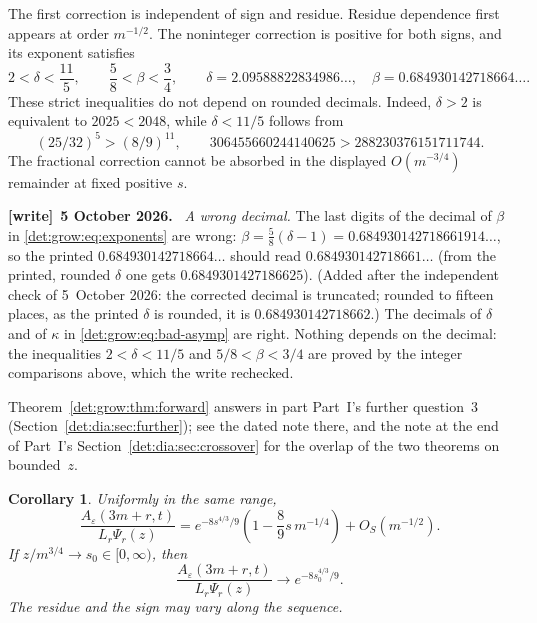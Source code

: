 \documentclass[11pt,letterpaper]{article}
\numberwithin{equation}{section}
\newtheorem{corollary}[theorem]{Corollary}
\theoremstyle{definition}\newtheorem{definition}[theorem]{Definition}
\theoremstyle{remark}\newtheorem{remark}[theorem]{Remark}
\newcommand{\eps}{\varepsilon}
\newenvironment{writenote}[1][]{\par\smallskip\begingroup\small
 \noindent\textbf{[write]}\if\relax\detokenize{#1}\relax\else~\textbf{#1.}\fi\ }%
 {\par\endgroup\smallskip}
\begin{document}
The first correction is independent of sign and residue. Residue
dependence first appears at order $m^{-1/2}$. The noninteger correction
is positive for both signs, and its exponent satisfies
\begin{equation}\label{det:grow:eq:exponents}
 2<\delta<\frac{11}{5},\qquad
 \frac58<\beta<\frac34,
 \qquad
 \delta=2.09588822834986\ldots,\quad
 \beta=0.684930142718664\ldots.
\end{equation}
These strict inequalities do not depend on rounded decimals. Indeed,
$\delta>2$ is equivalent to $2025<2048$, while $\delta<11/5$ follows from
\[
 (25/32)^5>(8/9)^{11},\qquad
 306455660244140625>288230376151711744.
\]
The fractional correction cannot be absorbed in the displayed
$O(m^{-3/4})$ remainder at fixed positive $s$.
\begin{writenote}[5 October 2026]
\emph{A wrong decimal.} The last digits of the decimal of $\beta$ in \eqref{det:grow:eq:exponents} are wrong: $\beta=\frac58(\delta-1)=0.684930142718661914\ldots$, so the printed $0.684930142718664\ldots$ should read $0.684930142718661\ldots$ (from the printed, rounded $\delta$ one gets $0.6849301427186625$). \textup{(Added after the independent check of 5~October 2026: the corrected decimal is truncated; rounded to fifteen places, as the printed $\delta$ is rounded, it is $0.684930142718662$.)} The decimals of $\delta$ and of $\kappa$ in \eqref{det:grow:eq:bad-asymp} are right. Nothing depends on the decimal: the inequalities $2<\delta<11/5$ and $5/8<\beta<3/4$ are proved by the integer comparisons above, which the write rechecked.

Theorem~\ref{det:grow:thm:forward} answers in part Part~I's further question~3 (Section~\ref{det:dia:sec:further}); see the dated note there, and the note at the end of Part~I's Section~\ref{det:dia:sec:crossover} for the overlap of the two theorems on bounded~$z$.
\end{writenote}

\begin{corollary}\label{det:grow:cor:limit}
Uniformly in the same range,
\begin{equation}\label{det:grow:eq:first}
 \frac{A_\eps(3m+r,t)}{L_r\Psi_r(z)}
 =e^{-8s^{4/3}/9}\left(1-\frac89s\,m^{-1/4}\right)
 +O_S(m^{-1/2}).
\end{equation}
If $z/m^{3/4}\to s_0\in[0,\infty)$, then
\begin{equation}\label{det:grow:eq:limit}
 \frac{A_\eps(3m+r,t)}{L_r\Psi_r(z)}\longrightarrow e^{-8s_0^{4/3}/9}.
\end{equation}
The residue and the sign may vary along the sequence.
\end{corollary}
\end{document}
